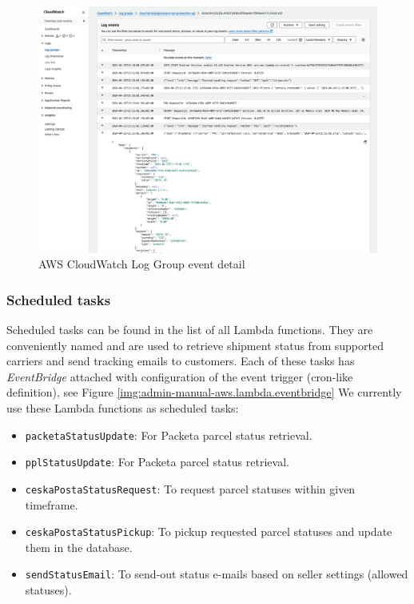 \begin{figure}[H]\centering
\includegraphics[width=140mm]{img/docs/fig_aws_log_event.png}
\caption{AWS CloudWatch Log Group event detail}
\label{img:admin-manual-aws.lambda.log.event.detail}
\end{figure}

\subsubsection{Scheduled tasks}
\label{attachments:admin-manual-lambda.scheduled-tasks}
Scheduled tasks can be found in the list of all Lambda functions.
They are conveniently named and are used to retrieve shipment status from supported carriers and send tracking emails to customers.
Each of these tasks has \textit{EventBridge} attached with configuration of the event trigger (cron-like definition), see Figure \ref{img:admin-manual-aws.lambda.eventbridge}
We currently use these Lambda functions as scheduled tasks:
\begin{itemize}
    \item \texttt{packetaStatusUpdate}: For Packeta parcel status retrieval.
    \item \texttt{pplStatusUpdate}: For Packeta parcel status retrieval.
    \item \texttt{ceskaPostaStatusRequest}: To request parcel statuses within given timeframe.
    \item \texttt{ceskaPostaStatusPickup}: To pickup requested parcel statuses and update them in the database.
    \item \texttt{sendStatusEmail}: To send-out status e-mails based on seller settings (allowed statuses).
\end{itemize}

